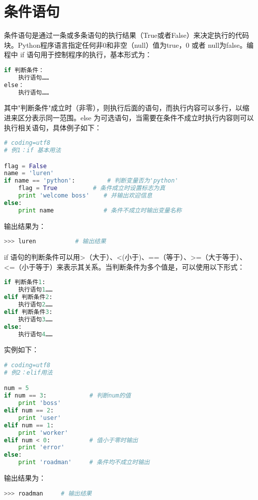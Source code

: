 \section{条件语句}
条件语句是通过一条或多条语句的执行结果（True或者False）来决定执行的代码块。Python程序语言指定任何非0和非空（null）值为true，0 或者 null为false。编程中 if 语句用于控制程序的执行，基本形式为：
\begin{lstlisting}[language=Python]
if 判断条件：
    执行语句……
else：
    执行语句……
\end{lstlisting}
其中"判断条件"成立时（非零），则执行后面的语句，而执行内容可以多行，以缩进来区分表示同一范围。else 为可选语句，当需要在条件不成立时执行内容则可以执行相关语句，具体例子如下：
\begin{lstlisting}[language=Python]
# coding=utf8
# 例1：if 基本用法

flag = False
name = 'luren'
if name == 'python':         # 判断变量否为'python'
    flag = True          # 条件成立时设置标志为真
    print 'welcome boss'    # 并输出欢迎信息
else:
    print name              # 条件不成立时输出变量名称
\end{lstlisting}
输出结果为：
\begin{lstlisting}[language=Python]
>>> luren			# 输出结果
\end{lstlisting}

if 语句的判断条件可以用>（大于）、<(小于)、==（等于）、>=（大于等于）、<=（小于等于）来表示其关系。当判断条件为多个值是，可以使用以下形式：
\begin{lstlisting}[language=Python]
if 判断条件1:
    执行语句1……
elif 判断条件2:
    执行语句2……
elif 判断条件3:
    执行语句3……
else:
    执行语句4……
\end{lstlisting}
实例如下：
\begin{lstlisting}[language=Python]
# coding=utf8
# 例2：elif用法

num = 5     
if num == 3:            # 判断num的值
    print 'boss'        
elif num == 2:
    print 'user'
elif num == 1:
    print 'worker'
elif num < 0:           # 值小于零时输出
    print 'error'
else:
    print 'roadman'     # 条件均不成立时输出
\end{lstlisting}
输出结果为：
\begin{lstlisting}[language=Python]
>>> roadman		# 输出结果
\end{lstlisting}

